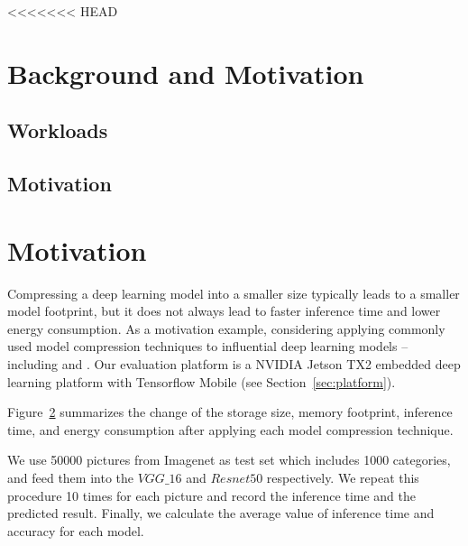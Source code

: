 <<<<<<< HEAD
\section{Background and Motivation}
\subsection{Workloads}

\subsection{Motivation}

\section{Motivation}
Compressing a deep learning model into a smaller size typically leads to a smaller model footprint, but it does not always lead to faster
inference time and lower energy consumption. As a motivation example, considering applying  commonly used model compression
techniques to  influential deep learning models -- including  \CNNs and . Our evaluation platform is a
NVIDIA Jetson TX2 embedded deep learning platform with Tensorflow Mobile  (see Section~\ref{sec:platform}).

Figure~\ref{} summarizes the change of the storage size, memory footprint, inference time, and energy consumption after applying each model
compression technique.

We use 50000 pictures from Imagenet as test set
which includes 1000 categories,
and feed them into the $VGG\_16$ and $Resnet50$ respectively. 
We repeat this procedure 10 times for each picture
and record the inference time and the predicted result.
Finally, we calculate the average value of inference time and accuracy
for each model.

